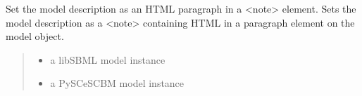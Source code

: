 \documentclass[letterpaper,12pt,english]{sphinxmanual}
\begin{document}
\begin{fulllineitems}
\label{\detokenize{api/io:cbmpy.CBXML.sbml_setDescription}}
\pysigstartsignatures
\pysiglinewithargsret
{}
{\sphinxparamcomma {}}
{}
\pysigstopsignatures
\sphinxAtStartPar
Set the model description as an HTML paragraph in a \textless{}note\textgreater{} element. Sets the model description as a \textless{}note\textgreater{} containing HTML in a paragraph element on the model object.
\begin{quote}\begin{description}
\begin{itemize}
\item {} 
\sphinxAtStartPar
{} \textendash{} a libSBML model instance

\item {} 
\sphinxAtStartPar
{} \textendash{} a PySCeSCBM model instance

\end{itemize}

\sphinxAtStartPar
{}

\end{description}\end{quote}

\end{fulllineitems}

\end{document}
